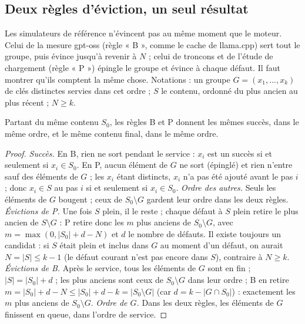 \subsection{Deux règles d'éviction, un seul résultat}

Les simulateurs de référence n'évincent pas au même moment que le moteur. Celui de la mesure gpt-oss (règle « B », comme le cache de llama.cpp) sert tout le groupe, puis évince jusqu'à revenir à $N$ ; celui de troncons et de l'étude de chargement (règle « P ») épingle le groupe et évince à chaque défaut. Il faut montrer qu'ils comptent la même chose. Notations : un groupe $G = (x_1, \ldots, x_k)$ de clés distinctes servies dans cet ordre ; $S$ le contenu, ordonné du plus ancien au plus récent ; $N \ge k$.

\begin{lemme}\label{lem:t2o-regles}
Partant du même contenu $S_0$, les règles B et P donnent les mêmes succès, dans le même ordre, et le même contenu final, dans le même ordre.
\end{lemme}

\begin{proof}
\emph{Succès.} En B, rien ne sort pendant le service : $x_i$ est un succès si et seulement si $x_i \in S_0$. En P, aucun élément de $G$ ne sort (épinglé) et rien n'entre sauf des éléments de $G$ ; les $x_i$ étant distincts, $x_i$ n'a pas été ajouté avant le pas $i$ ; donc $x_i \in S$ au pas $i$ si et seulement si $x_i \in S_0$.
\emph{Ordre des autres.} Seuls les éléments de $G$ bougent ; ceux de $S_0 \setminus G$ gardent leur ordre dans les deux règles.
\emph{Évictions de P.} Une fois $S$ plein, il le reste ; chaque défaut à $S$ plein retire le plus ancien de $S \setminus G$ : P retire donc les $m$ plus anciens de $S_0 \setminus G$, avec $m = \max(0, |S_0| + d - N)$ et $d$ le nombre de défauts. Il existe toujours un candidat : si $S$ était plein et inclus dans $G$ au moment d'un défaut, on aurait $N = |S| \le k - 1$ (le défaut courant n'est pas encore dans $S$), contraire à $N \ge k$.
\emph{Évictions de B.} Après le service, tous les éléments de $G$ sont en fin ; $|S| = |S_0| + d$ ; les plus anciens sont ceux de $S_0 \setminus G$ dans leur ordre ; B en retire $m = |S_0| + d - N \le |S_0| + d - k = |S_0 \setminus G|$ (car $d = k - |G \cap S_0|$) : exactement les $m$ plus anciens de $S_0 \setminus G$.
\emph{Ordre de $G$.} Dans les deux règles, les éléments de $G$ finissent en queue, dans l'ordre de service.
\end{proof}

